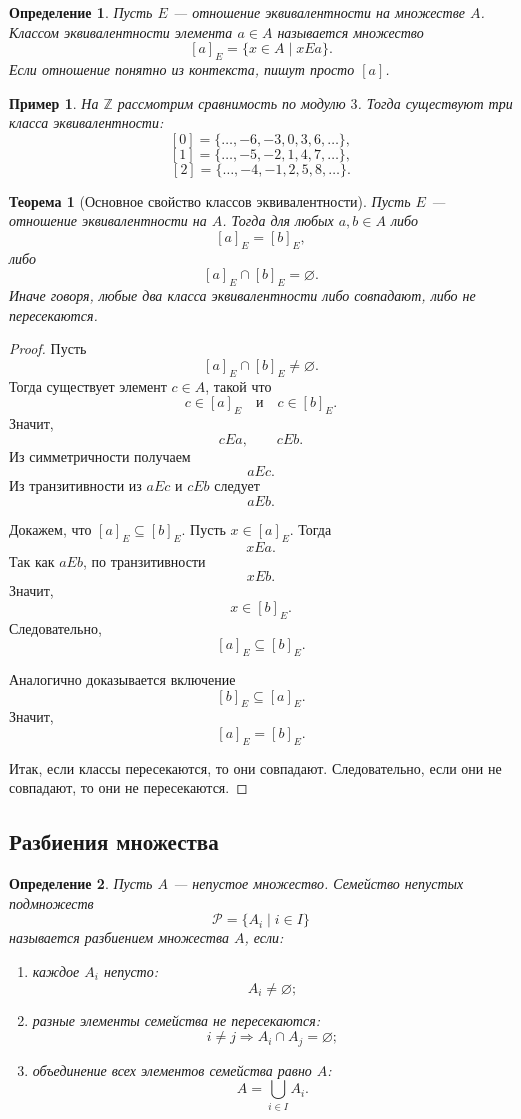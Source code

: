 \documentclass[12pt,a4paper]{article}
\newtheorem{definition}{Определение}
\newtheorem{theorem}{Теорема}
\newtheorem{example}{Пример}
\begin{document}
\begin{definition}
Пусть $E$ --- отношение эквивалентности на множестве $A$.
\emph{Классом эквивалентности} элемента $a\in A$ называется множество
\[
[a]_E=\{x\in A\mid xEa\}.
\]
Если отношение понятно из контекста, пишут просто $[a]$.
\end{definition}

\begin{example}
На $\mathbb Z$ рассмотрим сравнимость по модулю $3$.
Тогда существуют три класса эквивалентности:
\[
[0]=\{\dots,-6,-3,0,3,6,\dots\},
\]
\[
[1]=\{\dots,-5,-2,1,4,7,\dots\},
\]
\[
[2]=\{\dots,-4,-1,2,5,8,\dots\}.
\]
\end{example}

\begin{theorem}[Основное свойство классов эквивалентности]
Пусть $E$ --- отношение эквивалентности на $A$.
Тогда для любых $a,b\in A$ либо
\[
[a]_E=[b]_E,
\]
либо
\[
[a]_E\cap[b]_E=\varnothing.
\]
Иначе говоря, любые два класса эквивалентности либо совпадают, либо не пересекаются.
\end{theorem}

\begin{proof}
Пусть
\[
[a]_E\cap[b]_E\ne\varnothing.
\]
Тогда существует элемент $c\in A$, такой что
\[
c\in [a]_E
\quad\text{и}\quad
c\in [b]_E.
\]
Значит,
\[
cEa,\qquad cEb.
\]
Из симметричности получаем
\[
aEc.
\]
Из транзитивности из $aEc$ и $cEb$ следует
\[
aEb.
\]

Докажем, что $[a]_E\subseteq [b]_E$.
Пусть $x\in [a]_E$.
Тогда
\[
xEa.
\]
Так как $aEb$, по транзитивности
\[
xEb.
\]
Значит,
\[
x\in [b]_E.
\]
Следовательно,
\[
[a]_E\subseteq [b]_E.
\]

Аналогично доказывается включение
\[
[b]_E\subseteq [a]_E.
\]
Значит,
\[
[a]_E=[b]_E.
\]

Итак, если классы пересекаются, то они совпадают. Следовательно, если они не совпадают, то они не пересекаются.
\end{proof}

\subsection{Разбиения множества}

\begin{definition}
Пусть $A$ --- непустое множество.
Семейство непустых подмножеств
\[
\mathcal P=\{A_i\mid i\in I\}
\]
называется \emph{разбиением} множества $A$, если:

\begin{enumerate}
\item каждое $A_i$ непусто:
\[
A_i\ne\varnothing;
\]
\item разные элементы семейства не пересекаются:
\[
i\ne j\Rightarrow A_i\cap A_j=\varnothing;
\]
\item объединение всех элементов семейства равно $A$:
\[
A=\bigcup_{i\in I} A_i.
\]
\end{enumerate}
\end{definition}
\end{document}
